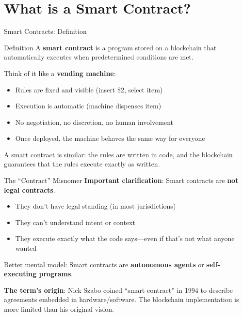 \documentclass[10pt]{beamer}
\newcommand{\highlight}[1]{\textcolor{AccentOrange}{\textbf{#1}}}
\begin{document}
\section{What is a Smart Contract?}

\begin{frame}{Smart Contracts: Definition}
  \begin{block}{Definition}
    A \textbf{smart contract} is a program stored on a blockchain that automatically executes when predetermined conditions are met.
  \end{block}
  
  \vspace{1em}
  Think of it like a \highlight{vending machine}:
  \begin{itemize}
    \item Rules are fixed and visible (insert \$2, select item)
    \item Execution is automatic (machine dispenses item)
    \item No negotiation, no discretion, no human involvement
    \item Once deployed, the machine behaves the same way for everyone
  \end{itemize}
  
  \vspace{1em}
  A smart contract is similar: the rules are written in code, and the blockchain guarantees that the rules execute exactly as written.
\end{frame}

\begin{frame}{The ``Contract'' Misnomer}
  \textbf{Important clarification}: Smart contracts are \highlight{not legal contracts}.
  
  \vspace{1em}
  \begin{itemize}
    \item They don't have legal standing (in most jurisdictions)
    \item They can't understand intent or context
    \item They execute exactly what the code says---even if that's not what anyone wanted
  \end{itemize}
  
  \vspace{1em}
  Better mental model: Smart contracts are \textbf{autonomous agents} or \textbf{self-executing programs}.
  
  \vspace{1em}
  \textbf{The term's origin}: Nick Szabo coined ``smart contract'' in 1994 to describe agreements embedded in hardware/software. The blockchain implementation is more limited than his original vision.
\end{frame}
\end{document}
